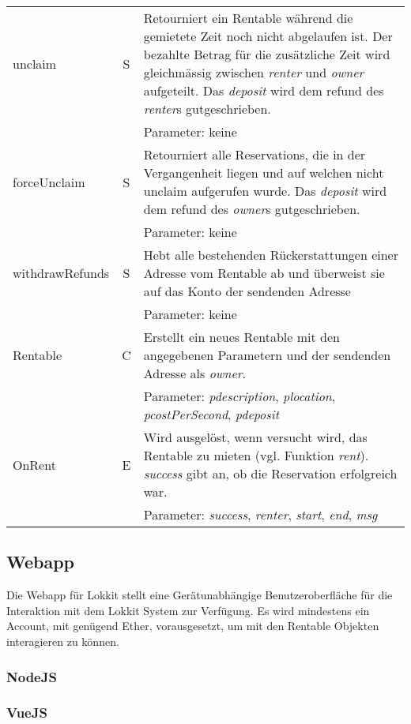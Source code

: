 \begin{longtable}{@{}lcL{9cm}@{}}
unclaim         & S   & Retourniert ein Rentable während die gemietete Zeit noch nicht abgelaufen ist. Der bezahlte Betrag für die zusätzliche Zeit wird gleichmässig zwischen \emph{renter} und \emph{owner} aufgeteilt. Das \emph{deposit} wird dem refund des \emph{renter}s gutgeschrieben.\\ & & Parameter: keine                            \\\midrule
forceUnclaim         & S   & Retourniert alle Reservations, die in der Vergangenheit liegen und auf welchen nicht unclaim aufgerufen wurde. Das \emph{deposit} wird dem refund des \emph{owner}s gutgeschrieben.\\ & & Parameter: keine                            \\\midrule
withdrawRefunds     & S   & Hebt alle bestehenden Rückerstattungen einer Adresse vom Rentable ab und überweist sie auf das Konto der sendenden Adresse\\ & & Parameter: keine                                                                     \\\midrule
Rentable            & C   & Erstellt ein neues Rentable mit den angegebenen Parametern und der sendenden Adresse als \emph{owner}.\\ & & Parameter: \emph{pdescription}, \emph{plocation}, \emph{pcostPerSecond}, \emph{pdeposit}                                                   \\ \midrule
OnRent              & E   & Wird ausgelöst, wenn versucht wird, das Rentable zu mieten (vgl. Funktion \emph{rent}). \emph{success} gibt an, ob die Reservation erfolgreich war.\\ & & Parameter: \emph{success}, \emph{renter}, \emph{start}, \emph{end}, \emph{msg} \\ \bottomrule
\end{longtable}

\subsection{Webapp}
Die Webapp für Lokkit stellt eine Gerätunabhängige Benutzeroberfläche für die Interaktion mit dem Lokkit System zur Verfügung. Es wird mindestens ein Account, mit genügend Ether, vorausgesetzt, um mit den Rentable Objekten interagieren zu können.
\subsubsection{NodeJS}
\subsubsection{VueJS}
